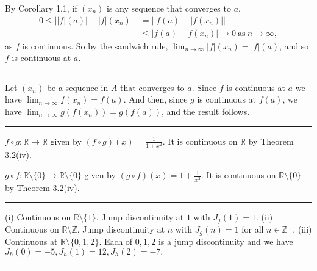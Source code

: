 \documentclass[letterpaper,10pt,english]{jupyterBook}
\begin{document}
By Corollary 1.1, if \((x_{n})\) is any sequence that converges to \(a\),
\begin{align*}
0 \leq ||f|(a)| -|f|(x_{n})| &= ||f(a) - |f(x_{n})|| \\
&\leq |f(a) - f(x_{n})| \rightarrow 0~\mbox{as}~n \rightarrow \infty, 
\end{align*}
\sphinxAtStartPar
as \(f\) is continuous. So by the sandwich rule, \(\lim_{n\rightarrow\infty} |f|(x_{n}) = |f|(a)\), and so \(f\) is continuous at \(a\).


\bigskip\hrule\bigskip


\sphinxAtStartPar
{\hyperref[\detokenize{Problems:id15}]{}} Let \((x_{n})\) be a sequence in \(A\) that converges to \(a\). Since \(f\) is continuous at \(a\) we have \(\lim_{n\rightarrow\infty} f(x_{n}) = f(a)\). And then, since \(g\) is continuous at \(f(a)\), we have \(\lim_{n\rightarrow\infty} g(f(x_{n})) = g(f(a))\), and the result follows.


\bigskip\hrule\bigskip


\sphinxAtStartPar
{\hyperref[\detokenize{Problems:id16}]{}} \(f \circ g:\mathbb{R}\to \mathbb{R}\) given by \((f \circ g)(x) = \frac{1}{1  + x^{2}}\). It is continuous on \(\mathbb{R}\) by Theorem 3.2(iv).

\(g \circ f:\mathbb{R} \setminus \{0\} \to \mathbb{R} \setminus \{0\}\) given by \((g \circ f)(x) = {1  + \frac{1}{x^2}}\). It is continuous on \(\mathbb{R} \setminus \{0\}\) by Theorem 3.2(iv).


\bigskip\hrule\bigskip


\sphinxAtStartPar
{\hyperref[\detokenize{Problems:id17}]{}}
(i) Continuous on \(\mathbb{R} \setminus \{1\}\). Jump discontinuity at \(1\) with \(J_{f}(1) = 1\).
(ii) Continuous on \(\mathbb{R} \setminus \mathbb{Z}\). Jump discontinuity at \(n\) with \(J_{g}(n) = 1\) for all \(n\in\mathbb{Z}_+\).
(iii) Continuous at \(\mathbb{R} \setminus \{0,1,2\}\). Each of \(0, 1, 2\) is a jump discontinuity and we have \(J_{h}(0) =-5, J_{h}(1) = 12, J_{h}(2) = -7.\)


\bigskip\hrule\bigskip


\sphinxAtStartPar
{\hyperref[\detokenize{Problems:id18}]{}}
\end{document}
